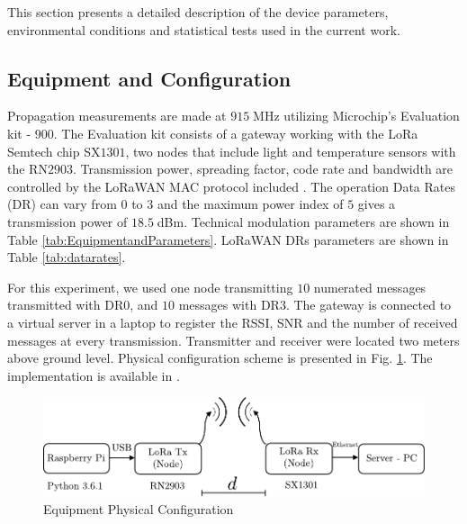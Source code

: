 This section presents a detailed description of the device parameters, environmental conditions and statistical tests used in the current work.

\subsection{Equipment and Configuration}
Propagation measurements are made at $915\;$MHz utilizing Microchip's Evaluation kit - $900$. The Evaluation kit consists of a gateway working with the LoRa Semtech chip SX$1301$, two nodes that include light and temperature sensors with the RN$2903$. Transmission power, spreading factor, code rate and bandwidth are controlled by the LoRaWAN MAC protocol included \cite{N.SorninSemtechM.LuisSemtechT.EirichIBMT.KrampIBM2015}. The operation Data Rates (DR) can vary from $0$ to $3$ and the maximum power index of $5$ gives a transmission power of $18.5\;$dBm. Technical modulation parameters are shown in Table \ref{tab:EquipmentandParameters}. LoRaWAN DRs parameters are shown in Table \ref{tab:datarates}. 

For this experiment, we used one node transmitting $10$ numerated messages transmitted with DR$0$, and $10$ messages with DR$3$. The gateway is connected to a virtual server in a laptop to register the RSSI, SNR and the number of received messages at every transmission. Transmitter and receiver were located two meters above ground level. Physical configuration scheme is presented in Fig. \ref{fig:physicalconfig}. The implementation is available in \cite{Avila2017}.

\begin{figure}[!htb]
  \centering
  \includegraphics[width=0.99\columnwidth]{Figure2}
  \caption{Equipment Physical Configuration}
  \label{fig:physicalconfig}
\end{figure}



